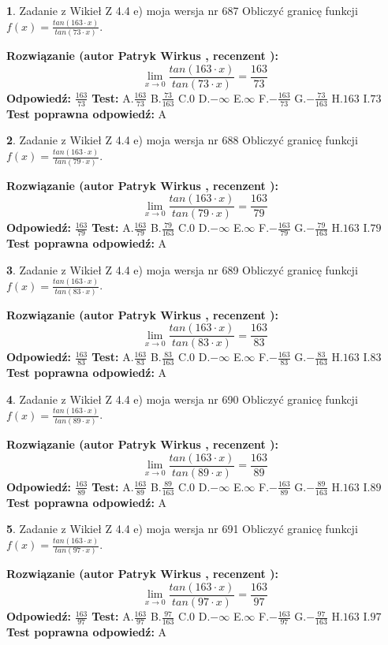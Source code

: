 \documentclass[12pt, a4paper]{article}
\theoremstyle{definition} %
\newtheorem{zad}{}
\newcommand{\zadStart}[1]{\begin{zad}#1\newline}
\newcommand{\zadStop}{\end{zad}}
\newcommand{\rozwStart}[2]{\noindent \textbf{Rozwiązanie (autor #1 , recenzent #2): }\newline}
\newcommand{\rozwStop}{\newline}
\newcommand{\odpStart}{\noindent \textbf{Odpowiedź:}\newline}
\newcommand{\odpStop}{\newline}
\newcommand{\testStart}{\noindent \textbf{Test:}\newline}
\newcommand{\testStop}{\newline}
\newcommand{\kluczStart}{\noindent \textbf{Test poprawna odpowiedź:}\newline}
\newcommand{\kluczStop}{\newline}
\begin{document}
\zadStart{Zadanie z Wikieł Z 4.4 e) moja wersja nr 687}
Obliczyć granicę funkcji $f(x)=\frac{tan(163\cdot x)}{tan(73\cdot x)}$.
\zadStop
\rozwStart{Patryk Wirkus}{}
$$\lim\limits_{x\to 0}\frac{tan(163\cdot x)}{tan(73\cdot x)}=
\frac{163}{73}$$
\rozwStop
\odpStart
$\frac{163}{73}$
\odpStop
\testStart
A.$\frac{163}{73}$
B.$\frac{73}{163}$
C.$0$
D.$-\infty$
E.$\infty$
F.$-\frac{163}{73}$
G.$-\frac{73}{163}$
H.$163$
I.$73$
\testStop
\kluczStart
A
\kluczStop



\zadStart{Zadanie z Wikieł Z 4.4 e) moja wersja nr 688}
Obliczyć granicę funkcji $f(x)=\frac{tan(163\cdot x)}{tan(79\cdot x)}$.
\zadStop
\rozwStart{Patryk Wirkus}{}
$$\lim\limits_{x\to 0}\frac{tan(163\cdot x)}{tan(79\cdot x)}=
\frac{163}{79}$$
\rozwStop
\odpStart
$\frac{163}{79}$
\odpStop
\testStart
A.$\frac{163}{79}$
B.$\frac{79}{163}$
C.$0$
D.$-\infty$
E.$\infty$
F.$-\frac{163}{79}$
G.$-\frac{79}{163}$
H.$163$
I.$79$
\testStop
\kluczStart
A
\kluczStop



\zadStart{Zadanie z Wikieł Z 4.4 e) moja wersja nr 689}
Obliczyć granicę funkcji $f(x)=\frac{tan(163\cdot x)}{tan(83\cdot x)}$.
\zadStop
\rozwStart{Patryk Wirkus}{}
$$\lim\limits_{x\to 0}\frac{tan(163\cdot x)}{tan(83\cdot x)}=
\frac{163}{83}$$
\rozwStop
\odpStart
$\frac{163}{83}$
\odpStop
\testStart
A.$\frac{163}{83}$
B.$\frac{83}{163}$
C.$0$
D.$-\infty$
E.$\infty$
F.$-\frac{163}{83}$
G.$-\frac{83}{163}$
H.$163$
I.$83$
\testStop
\kluczStart
A
\kluczStop



\zadStart{Zadanie z Wikieł Z 4.4 e) moja wersja nr 690}
Obliczyć granicę funkcji $f(x)=\frac{tan(163\cdot x)}{tan(89\cdot x)}$.
\zadStop
\rozwStart{Patryk Wirkus}{}
$$\lim\limits_{x\to 0}\frac{tan(163\cdot x)}{tan(89\cdot x)}=
\frac{163}{89}$$
\rozwStop
\odpStart
$\frac{163}{89}$
\odpStop
\testStart
A.$\frac{163}{89}$
B.$\frac{89}{163}$
C.$0$
D.$-\infty$
E.$\infty$
F.$-\frac{163}{89}$
G.$-\frac{89}{163}$
H.$163$
I.$89$
\testStop
\kluczStart
A
\kluczStop



\zadStart{Zadanie z Wikieł Z 4.4 e) moja wersja nr 691}
Obliczyć granicę funkcji $f(x)=\frac{tan(163\cdot x)}{tan(97\cdot x)}$.
\zadStop
\rozwStart{Patryk Wirkus}{}
$$\lim\limits_{x\to 0}\frac{tan(163\cdot x)}{tan(97\cdot x)}=
\frac{163}{97}$$
\rozwStop
\odpStart
$\frac{163}{97}$
\odpStop
\testStart
A.$\frac{163}{97}$
B.$\frac{97}{163}$
C.$0$
D.$-\infty$
E.$\infty$
F.$-\frac{163}{97}$
G.$-\frac{97}{163}$
H.$163$
I.$97$
\testStop
\kluczStart
A
\kluczStop
\end{document}
